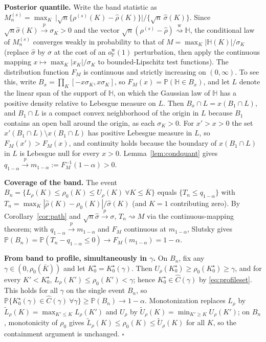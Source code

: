 \documentclass[11pt]{article}
\newcommand{\Pp}{\mathbb P}
\newcommand{\opro}{o_{\Pp}}
\newcommand{\dto}{\rightsquigarrow}
\newcommand{\dtow}{\overset{\mathrm w}{\rightsquigarrow}}
\newcommand{\pto}{\overset{p}{\to}}
\begin{document}
\textbf{Posterior quantile.} Write the band statistic as
$M_n^{(s)}=\max_K\,\bigl|\sqrt n\{\rho^{(s)}(K)-\hat\rho(K)\}\bigr|\big/\{\sqrt n\,\hat\sigma(K)\}$.
Since $\sqrt n\hat\sigma(K)\pto\sigma_K>0$ and the vector $\sqrt n(\rho^{(s)}-\hat\rho)\dtow\mathbb H$, the conditional law of $M_n^{(s)}$ converges weakly in probability to that of $M=\max_K|\mathbb H(K)|/\sigma_K$ (replace $\hat\sigma$ by $\sigma$ at the cost of an $\opro^{\mathrm w}(1)$ perturbation, then apply the continuous mapping $x\mapsto\max_K|x_K|/\sigma_K$ to bounded-Lipschitz test functions). The distribution function $F_M$ is continuous and strictly increasing on $(0,\infty)$. To see this, write $B_x=\prod_K[-x\sigma_K,x\sigma_K]$, so $F_M(x)=\Pp(\mathbb H\in B_x)$, and let $L$ denote the linear span of the support of $\mathbb H$, on which the Gaussian law of $\mathbb H$ has a positive density relative to Lebesgue measure on $L$. Then $B_x\cap L=x(B_1\cap L)$, and $B_1\cap L$ is a compact convex neighborhood of the origin in $L$ because $B_1$ contains an open ball around the origin, as each $\sigma_K>0$. For $x'>x>0$ the set $x'(B_1\cap L)\setminus x(B_1\cap L)$ has positive Lebesgue measure in $L$, so $F_M(x')>F_M(x)$, and continuity holds because the boundary of $x(B_1\cap L)$ in $L$ is Lebesgue null for every $x>0$. Lemma~\ref{lem:condquant} gives $q_{1-\alpha}\pto m_{1-\alpha}:=F_M^{-1}(1-\alpha)>0$.

\textbf{Coverage of the band.} The event $B_n=\{L_\rho(K)\le\rho_0(K)\le U_\rho(K)\ \forall K\le\overline K\}$ equals $\{T_n\le q_{1-\alpha}\}$ with
$T_n=\max_K|\hat\rho(K)-\rho_0(K)|/\hat\sigma(K)$ (and $K=1$ contributing zero). By Corollary~\ref{cor:path} and $\sqrt n\hat\sigma\pto\sigma$, $T_n\dto M$ via the continuous-mapping theorem; with $q_{1-\alpha}\pto m_{1-\alpha}$ and $F_M$ continuous at $m_{1-\alpha}$, Slutsky gives
$\Pp(B_n)=\Pp(T_n-q_{1-\alpha}\le0)\to F_M(m_{1-\alpha})=1-\alpha$.

\textbf{From band to profile, simultaneously in $\gamma$.} On $B_n$, fix any $\gamma\in(0,\rho_0(\overline K))$ and let $K_0^\star=K_0^\star(\gamma)$. Then $U_\rho(K_0^\star)\ge\rho_0(K_0^\star)\ge\gamma$, and for every $K'<K_0^\star$, $L_\rho(K')\le\rho_0(K')<\gamma$; hence $K_0^\star\in\widehat C(\gamma)$ by \eqref{eq:profileset}. This holds for all $\gamma$ on the single event $B_n$, so
$\Pp\{K^\star_0(\gamma)\in\widehat C(\gamma)\ \forall\gamma\}\ge\Pp(B_n)\to1-\alpha$.
Monotonization replaces $L_\rho$ by $\tilde L_\rho(K)=\max_{K'\le K}L_\rho(K')$ and $U_\rho$ by $\tilde U_\rho(K)=\min_{K'\ge K}U_\rho(K')$; on $B_n$, monotonicity of $\rho_0$ gives $\tilde L_\rho(K)\le\rho_0(K)\le\tilde U_\rho(K)$ for all $K$, so the containment argument is unchanged. \hfill$\square$
\end{document}
